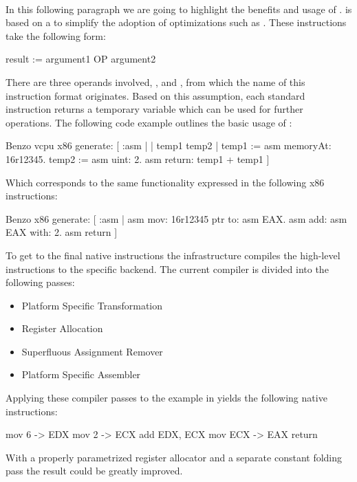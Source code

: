 \paragraph{\VCPU}
In this following paragraph we are going to highlight the benefits and usage of .
\VCPU is based on a \TAC to simplify the adoption of optimizations such as \SSA.
These \TAC instructions take the following form:
%
\begin{stcode}{}
result := argument1 OP argument2
\end{stcode}
%
There are three operands involved, ,  and , from which the name of this instruction format originates.
Based on this assumption, each standard \VCPU instruction returns a temporary variable which can be used for further operations.
The following code example outlines the basic usage of \VCPU:
%
\begin{stcode}[
	label={lst:benzo-problem-vcpu}, 
	caption={Basic \VCPU Example}
]{}
Benzo vcpu x86 generate: [ :asm | | temp1 temp2 |
	temp1 := asm memoryAt: 16r12345.
	temp2 := asm uint: 2.
	asm return: temp1 + temp1 ]
\end{stcode}
%
Which corresponds to the same functionality expressed in the following x86 instructions:
%
\begin{stcode}{}
Benzo x86 generate: [ :asm |
	asm mov: 16r12345 ptr to: asm EAX.
	asm add: asm EAX with: 2.
	asm return ]
\end{stcode}
%
To get to the final native instructions the \VCPU infrastructure compiles the high-level instructions to the specific backend.
The current compiler is divided into the following passes:
%
\begin{itemize}[noitemsep]
\item Platform Specific Transformation
\item Register Allocation
\item Superfluous Assignment Remover
\item Platform Specific Assembler
\end{itemize}
%
Applying these compiler passes to the example in  yields the following native instructions:
%
\begin{stcode}{}
mov   6 -> EDX
mov   2 -> ECX
add EDX,   ECX
mov ECX -> EAX
return 
\end{stcode}


\noindent With a properly parametrized register allocator and a separate constant folding pass the result could be greatly improved.

